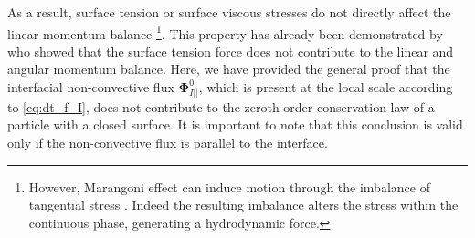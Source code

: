 As a result, surface tension or surface viscous stresses do not directly affect the linear momentum balance \footnote{However, Marangoni effect can induce motion through the imbalance of tangential stress \citep{young1959}. Indeed the resulting imbalance alters the stress within the continuous phase, generating a hydrodynamic force.}. 
This property has already been demonstrated by \citet{hesla1993note} who showed that the surface tension force does not contribute to the linear and angular momentum balance. 
Here, we have provided the general proof that the interfacial non-convective flux $\mathbf{\Phi}_{I||}^0$, which is present at the local scale according to \ref{eq:dt_f_I}, does not contribute to the zeroth-order conservation law of a particle with a closed surface.
It is important to note that this conclusion is valid only if the non-convective flux is parallel to the interface.


